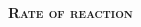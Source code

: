 \documentclass[main.tex]{subfiles}
\begin{document}
\newpage
{}
\fancyhfoffset[E,O]{0pt}
\setlength{\columnsep}{30pt}
\begin{conclusion}
\end{conclusion}
\begin{multicols*}{2}\setcounter{numA}{1}




{\raggedright\textsc{\textbf{Rate of reaction }}\par}





\end{multicols*}
\end{document}
